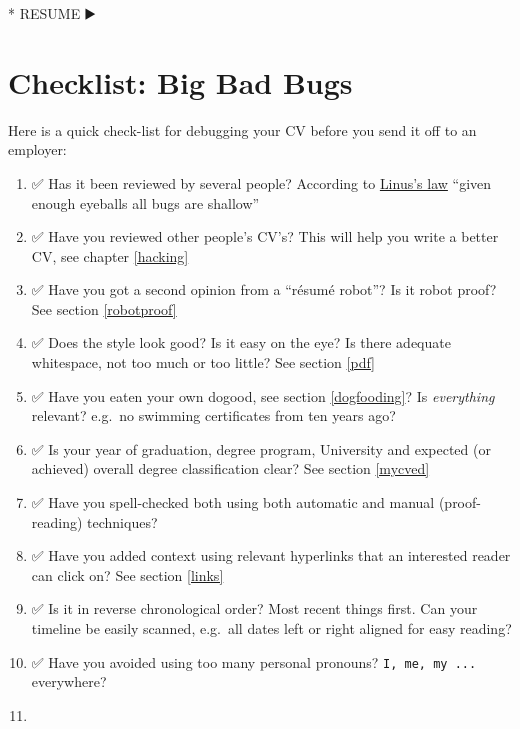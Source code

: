 \documentclass[
]{book}
\newenvironment{Shaded}{\begin{snugshade}}{\end{snugshade}}
\newcommand{\NormalTok}[1]{#1}
\newcommand{\SpecialStringTok}[1]{\textcolor[rgb]{0.31,0.60,0.02}{#1}}
\providecommand{\tightlist}{%
  \setlength{\itemsep}{0pt}\setlength{\parskip}{0pt}}
\begin{document}
\begin{Shaded}
\begin{Highlighting}[]
\SpecialStringTok{* }\NormalTok{RESUME ▶️}
\end{Highlighting}
\end{Shaded}

\hypertarget{checklist}{%
\section{Checklist: Big Bad Bugs}\label{checklist}}

Here is a quick check-list for debugging your CV before you send it off to an employer:

\begin{enumerate}
\def\labelenumi{\arabic{enumi}.}
\tightlist
\item
  ✅ Has it been reviewed by several people? According to \href{https://en.wikipedia.org/wiki/Linus\%27s_law}{Linus's law} ``given enough eyeballs all bugs are shallow'' \citep{Raymond1999}
\item
  ✅ Have you reviewed other people's CV's? This will help you write a better CV, see chapter \ref{hacking}
\item
  ✅ Have you got a second opinion from a ``résumé robot''? Is it robot proof? See section \ref{robotproof} 🤖
\item
  ✅ Does the style look good? Is it easy on the eye? Is there adequate whitespace, not too much or too little? See section \ref{pdf}
\item
  ✅ Have you eaten your own dogood, see section \ref{dogfooding}? Is \emph{everything} relevant? e.g.~no swimming certificates from ten years ago?
\item
  ✅ Is your year of graduation, degree program, University and expected (or achieved) overall degree classification clear? See section \ref{mycved}
\item
  ✅ Have you spell-checked both using both automatic and manual (proof-reading) techniques?
\item
  ✅ Have you added context using relevant hyperlinks that an interested reader can click on? See section \ref{links}
\item
  ✅ Is it in reverse chronological order? Most recent things first. Can your timeline be easily scanned, e.g.~all dates left or right aligned for easy reading?
\item
  ✅ Have you avoided using too many personal pronouns? \texttt{I,\ me,\ my\ ...} everywhere?
\item

\end{enumerate}
\end{document}
